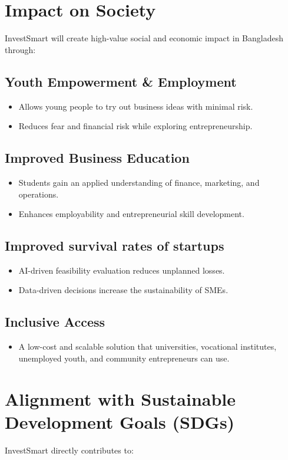 \documentclass[12pt,letterpaper]{article}
\begin{document}
\section{Impact on Society}
InvestSmart will create high-value social and economic impact in Bangladesh through:

\subsection{Youth Empowerment \& Employment}
\begin{itemize}
    \item Allows young people to try out business ideas with minimal risk.
    \item Reduces fear and financial risk while exploring entrepreneurship.
\end{itemize}

\subsection{Improved Business Education}
\begin{itemize}
    \item Students gain an applied understanding of finance, marketing, and operations.
    \item Enhances employability and entrepreneurial skill development.
\end{itemize}

\subsection{Improved survival rates of startups}
\begin{itemize}
    \item AI-driven feasibility evaluation reduces unplanned losses.
    \item Data-driven decisions increase the sustainability of SMEs.
\end{itemize}

\subsection{Inclusive Access}
\begin{itemize}
    \item A low-cost and scalable solution that universities, vocational institutes, unemployed youth, and community entrepreneurs can use.
\end{itemize}

\section{Alignment with Sustainable Development Goals (SDGs)}
InvestSmart directly contributes to:
\end{document}
